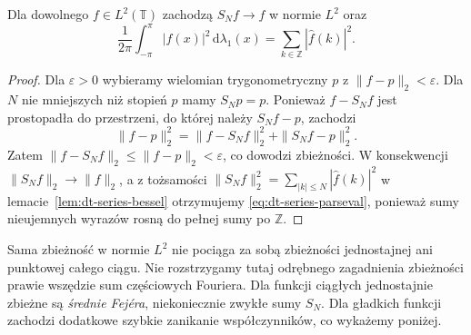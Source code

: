 \begin{twierdzenie}
\label{thm:dt-series-parseval}
Dla dowolnego $f\in L^2(\mathbb T)$ zachodzą
$S_Nf\to f$ w normie $L^2$ oraz
\begin{equation}\label{eq:dt-series-parseval}
 \frac1{2\pi}\int_{-\pi}^{\pi}|f(x)|^2\,\mathrm d\lambda_1(x)
 =\sum_{k\in\mathbb Z}|\widehat f(k)|^2.
\end{equation}
\end{twierdzenie}
\begin{proof}
Dla $\varepsilon>0$ wybieramy wielomian trygonometryczny $p$
z $\|f-p\|_2<\varepsilon$. Dla $N$ nie mniejszych niż stopień
$p$ mamy $S_Np=p$. Ponieważ $f-S_Nf$ jest
prostopadła do przestrzeni, do której należy
$S_Nf-p$, zachodzi
\[
 \|f-p\|_2^2=\|f-S_Nf\|_2^2+\|S_Nf-p\|_2^2.
\]
Zatem $\|f-S_Nf\|_2\leq\|f-p\|_2<\varepsilon$,
co dowodzi zbieżności.
W konsekwencji $\|S_Nf\|_2\to\|f\|_2$,
a z tożsamości $\|S_Nf\|_2^2=
\sum_{|k|\leq N}|\widehat f(k)|^2$
w lemacie~\ref{lem:dt-series-bessel} otrzymujemy
\eqref{eq:dt-series-parseval}, ponieważ sumy
nieujemnych wyrazów rosną do pełnej sumy po $\mathbb Z$.
\end{proof}

\begin{uwaga}
Sama zbieżność w normie $L^2$ nie pociąga
za sobą zbieżności jednostajnej ani punktowej
całego ciągu. Nie rozstrzygamy tutaj odrębnego
zagadnienia zbieżności prawie wszędzie sum
częściowych Fouriera. Dla funkcji ciągłych jednostajnie zbieżne są
\emph{średnie Fejéra}, niekoniecznie zwykłe sumy $S_N$.
Dla gładkich funkcji zachodzi dodatkowe szybkie zanikanie
współczynników, co wykażemy poniżej.
\end{uwaga}

